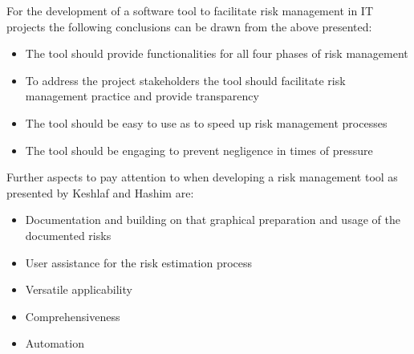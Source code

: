 For the development of a software tool to facilitate risk management in IT projects the following conclusions can be drawn from the above presented:\\
\begin{itemize}
	\item The tool should provide functionalities for all four phases of risk management
	\item To address the project stakeholders the tool should facilitate risk management practice and provide transparency
	\item The tool should be easy to use as to speed up risk management processes
	\item The tool should be engaging to prevent negligence in times of pressure	
\end{itemize}
Further aspects to pay attention to when developing a risk management tool as presented by Keshlaf and Hashim \cite{keshlafModelPrototypeTool2000} are:
\begin{itemize}
	\item	Documentation and building on that graphical preparation and usage of the documented risks
	\item	User assistance for the risk estimation process
	\item	Versatile applicability
	\item	Comprehensiveness
	\item	Automation	
\end{itemize}